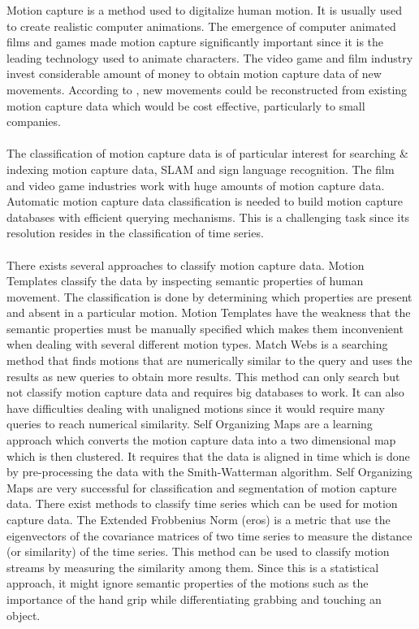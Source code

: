 \documentclass[10pt]{article}
\begin{document}
Motion capture is a method used to digitalize human motion. It is usually used to create realistic computer animations. The emergence of computer animated films and games made motion capture significantly important since it is the leading technology used to animate characters. The video game and film industry invest considerable amount of money to obtain motion capture data of new movements. According to \cite{EfficientMotionIndexing}, new movements could be reconstructed from existing motion capture data which would be cost effective, particularly to small companies. 
\\\\
The classification of motion capture data is of particular interest for searching \& indexing motion capture data\cite{EfficientMotionIndexing,AutomatedExtractionMotion}, SLAM\cite{EstimationHummanTraj} and sign language recognition\cite{ZhengSegmentationRecognition}. The film and video game industries work with huge amounts of motion capture data. Automatic motion capture data classification is needed to build motion capture databases with efficient querying mechanisms. This is a challenging task since its resolution resides in the classification of time series.
\\\\
There exists several approaches to classify motion capture data. Motion Templates \cite{MotionTemplates} classify the data by inspecting semantic properties of human movement. The classification is done by determining which properties are present and absent in a particular motion. Motion Templates have the weakness that the semantic properties must be manually specified which makes them inconvenient when dealing with several different motion types. Match Webs\cite{AutomatedExtractionMotion} is a searching method that finds motions that are numerically similar to the query and uses the results as new queries to obtain more results. This method can only search but not classify motion capture data and requires big databases to work. It can also have difficulties dealing with unaligned motions since it would require many queries to reach numerical similarity. Self Organizing Maps\cite{EfficientMotionIndexing} are a learning approach which converts the motion capture data into a two dimensional map which is then clustered. It requires that the data is aligned in time which is done by pre-processing the data with the Smith-Watterman algorithm. Self Organizing Maps are very successful for classification and segmentation of motion capture data. There exist methods to classify time series which can be used for motion capture data. The Extended Frobbenius Norm (eros)\cite{SimilarityMeasure} is a metric that use the eigenvectors of the covariance matrices of two time series to measure the distance (or similarity) of the time series. This method can be used to classify motion streams by measuring the similarity among them. Since this is a statistical approach, it might ignore semantic properties of the motions such as the importance of the hand grip while differentiating grabbing and touching an object.
\end{document}

